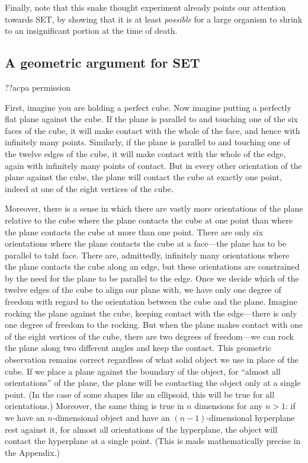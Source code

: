 Finally, note that this snake thought experiment already points our attention towards SET, by showing that it is 
at least \textit{possible} for a large organism to shrink to an insignificant portion at the time of death.  

\subsection{A geometric argument for SET}
??acpa permission

First, imagine you are holding a perfect cube. Now imagine putting a perfectly flat plane against the cube. If the 
plane is parallel to and touching one of the six faces of the cube, it will make contact with the whole of the face, 
and hence with infinitely many points. Similarly, if the plane is parallel to and touching one of the twelve edges 
of the cube, it will make contact with the whole of the edge, again with infinitely many points of contact. But in 
every other orientation of the plane against the cube, the plane will contact the cube at exactly one point, indeed at 
one of the eight vertices of the cube. 

Moreover, there is a sense in which there are vastly more orientations of the plane relative to the cube where the 
plane contacts the cube at one point than where the plane contacts the cube at more than one point. There are only 
six orientations where the plane contacts the cube at a face---the plane has to be parallel to taht face. There are, 
admittedly, infinitely many orientations where the plane contacts the cube along an edge, but these orientations 
are constrained by the need for the plane to be parallel to the edge. Once we decide which of the twelve edges of 
the cube to align our plane with, we have only one degree of freedom with regard to the orientation between the cube 
and the plane. Imagine rocking the plane against the cube, keeping contact with the edge---there is only one degree 
of freedom to the rocking. But when the plane makes contact with one of the eight vertices of the cube, there are two 
degrees of freedom—we can rock the plane along two different angles and keep the contact. This geometric observation 
remains correct regardless of what solid object we use in place of the cube. If we place a plane against the boundary 
of the object, for ``almost all orientations'' of the plane, the plane will be contacting the object only at a single 
point. (In the case of some shapes like an ellipsoid, this will be true for all orientations.) Moreover, the same thing is 
true in $n$ dimensions for any $n>1$: if we have an $n$-dimensional object and have an $(n-1)$-dimensional hyperplane rest 
against it, for almost all orientations of the hyperplane, the object will contact the hyperplane at a single point. 
(This is made mathematically precise in the Appendix.)

